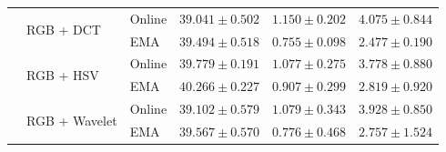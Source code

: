 \begin{table}[htbp]
\begin{tabular}{lllccc}
\addlinespace[2pt]
 & \multirow{2}{*}{RGB + DCT} & Online & $39.041 \pm 0.502$ & $1.150 \pm 0.202$ & $4.075 \pm 0.844$ \\
 &  & EMA & $39.494 \pm 0.518$ & $0.755 \pm 0.098$ & $2.477 \pm 0.190$ \\
\addlinespace[2pt]
 & \multirow{2}{*}{RGB + HSV} & Online & $39.779 \pm 0.191$ & $1.077 \pm 0.275$ & $3.778 \pm 0.880$ \\
 &  & EMA & $40.266 \pm 0.227$ & $0.907 \pm 0.299$ & $2.819 \pm 0.920$ \\
\addlinespace[2pt]
 & \multirow{2}{*}{RGB + Wavelet} & Online & $39.102 \pm 0.579$ & $1.079 \pm 0.343$ & $3.928 \pm 0.850$ \\
 &  & EMA & $39.567 \pm 0.570$ & $0.776 \pm 0.468$ & $2.757 \pm 1.524$ \\
\bottomrule
\end{tabular}
\end{table}